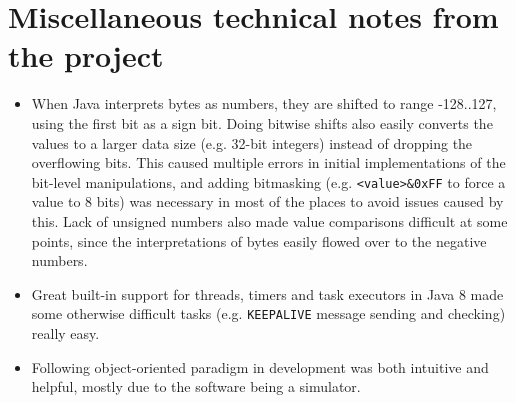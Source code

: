 \documentclass[11pt,a4paper,titlepage]{report}
\begin{document}
\section{Miscellaneous technical notes from the project}\label{sec:notes}
\begin{itemize}
\item When Java interprets bytes as numbers, they are shifted to range -128..127, using the first bit as a sign bit. Doing bitwise shifts also easily converts the values to a larger data size (e.g. 32-bit integers) instead of dropping the overflowing bits. This caused multiple errors in initial implementations of the bit-level manipulations, and adding bitmasking (e.g. \texttt{<value>\&0xFF} to force a value to 8 bits) was necessary in most of the places to avoid issues caused by this. Lack of unsigned numbers also made value comparisons difficult at some points, since the interpretations of bytes easily flowed over to the negative numbers.
\item Great built-in support for threads, timers and task executors in Java 8 made some otherwise difficult tasks (e.g. \texttt{KEEPALIVE} message sending and checking) really easy.
\item Following object-oriented paradigm in development was both intuitive and helpful, mostly due to the software being a simulator.
\end{itemize}



\end{document}
